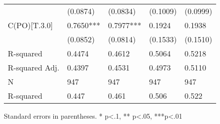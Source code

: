 \begin{table}
\begin{center}
\begin{tabular}{lllll}
                         & (0.0874)   & (0.0834)   & (0.1009)   & (0.0999)    \\
C(PO)[T.3.0]             & 0.7650***  & 0.7977***  & 0.1924     & 0.1938      \\
                         & (0.0852)   & (0.0814)   & (0.1533)   & (0.1510)    \\
R-squared                & 0.4474     & 0.4612     & 0.5064     & 0.5218      \\
R-squared Adj.           & 0.4397     & 0.4531     & 0.4973     & 0.5110      \\
N                        & 947        & 947        & 947        & 947         \\
R-squared                & 0.447      & 0.461      & 0.506      & 0.522       \\
\hline
\end{tabular}
\end{center}
\end{table}
\bigskip
Standard errors in parentheses. \newline 
* p<.1, ** p<.05, ***p<.01